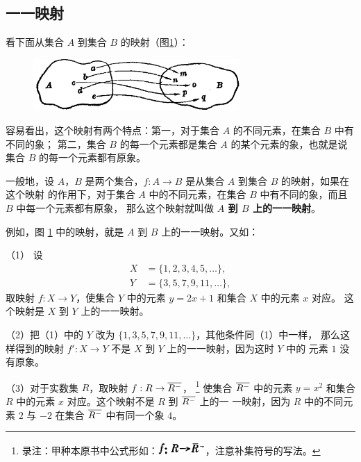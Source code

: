 \subsection{一一映射}\label{subsec:1-8}

看下面从集合 $A$ 到集合 $B$ 的映射（图\ref{fig:1-23}）：

\begin{figure}[htbp]
    \centering
    \includegraphics[width=0.7\textwidth]{pic/1-23}
    \caption{}\label{fig:1-23}
\end{figure}

容易看出，这个映射有两个特点：第一，对于集合 $A$ 的不同元素，在集合 $B$ 中有不同的象；
第二，集合 $B$ 的每一个元素都是集合 $A$ 的某个元素的象，也就是说集合 $B$ 的每一个元素都有原象。

一般地，设 $A$，$B$ 是两个集合，$f: A \to B$ 是从集合 $A$ 到集合 $B$ 的映射，如果在这个映射
的作用下，对于集合 $A$ 中的不同元素，在集合 $B$ 中有不同的象，而且 $B$ 中每一个元素都有原象，
那么这个映射就叫做 \textbf{$A$ 到 $B$ 上的一一映射}。

例如，图 \ref{fig:1-23} 中的映射，就是 $A$ 到 $B$ 上的一一映射。又如：

（1） 设
\begin{align*}
    X &= \{1, 2, 3, 4, 5, \dots \},\\
    Y &= \{3, 5, 7, 9, 11, \dots \},
\end{align*}
取映射 $f: X \to Y$，使集合 $Y$ 中的元素 $y = 2x + 1$ 和集合 $X$ 中的元素 $x$ 对应。
这个映射是 $X$ 到 $Y$ 上的一一映射。

（2）把（1）中的 $Y$ 改为 $\{1, 3, 5, 7, 9, 11, \dots \}$，其他条件同（1）中一样，
那么这样得到的映射 $f': X \to Y$ 不是 $X$ 到 $Y$ 上的一一映射，因为这时 $Y$ 中的
元素 $1$ 没有原象。

（3）对于实数集 $R$，取映射 $f: R \to \overline{R^-}$，
\footnote{录注：甲种本原书中公式形如：\includegraphics[width=1.8cm]{pic/ch-1-8-1}，注意补集符号的写法。}
使集合 $\overline{R^-}$ 中的元素 $y = x^2$ 和集合 $R$ 中的元素 $x$ 对应。这个映射不是 $R$ 到 $\overline{R^-}$ 上的一
一映射，因为 $R$ 中的不同元素 $2$ 与 $-2$ 在集合 $\overline{R^-}$ 中有同一个象 $4$。

